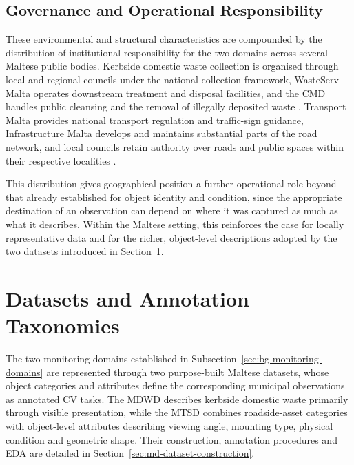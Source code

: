 \subsection{Governance and Operational Responsibility}
\label{sec:bg-governance}
These environmental and structural characteristics are compounded by the distribution of institutional responsibility for the two domains across several Maltese public bodies. Kerbside domestic waste collection is organised through local and regional councils under the national collection framework, WasteServ Malta operates downstream treatment and disposal facilities, and the \gls{CMD} handles public cleansing and the removal of illegally deposited waste \cite{wastecollection2026web,era2023web,wasteserv2026web,cmd2026web}. Transport Malta provides national transport regulation and traffic-sign guidance, Infrastructure Malta develops and maintains substantial parts of the road network, and local councils retain authority over roads and public spaces within their respective localities \cite{transportmalta2021guidelines,infrastructuremalta2020spec,localcouncilsact1993}.

This distribution gives geographical position a further operational role beyond that already established for object identity and condition, since the appropriate destination of an observation can depend on where it was captured as much as what it describes. Within the Maltese setting, this reinforces the case for locally representative data and for the richer, object-level descriptions adopted by the two datasets introduced in Section~\ref{sec:bg-datasets}.

\section{Datasets and Annotation Taxonomies}
\label{sec:bg-datasets}
The two monitoring domains established in Subsection~\ref{sec:bg-monitoring-domains} are represented through two purpose-built Maltese datasets, whose object categories and attributes define the corresponding municipal observations as annotated \gls{CV} tasks. The \gls{MDWD} describes kerbside domestic waste primarily through visible presentation, while the \gls{MTSD} combines roadside-asset categories with object-level attributes describing viewing angle, mounting type, physical condition and geometric shape. Their construction, annotation procedures and \gls{EDA} are detailed in Section~\ref{sec:md-dataset-construction}.

